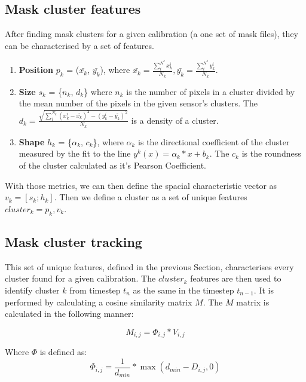 \subsection{Mask cluster features}

After finding mask clusters for a given calibration (a one set of mask files), they can be characterised by a set of features.

\begin{enumerate}
\item \textbf{Position}  {$p_k$ = ($\bar{x_k}$, $\bar{y_k}$}), where $\bar{x_k} = \frac{\sum_{i}^{N^k}x_k^i}{N_k},
    \bar{y_k} = \frac{\sum_{i}^{N^k}y_k^i}{N_k}$.
\item \textbf{Size} $s_k$ = \{$n_k$, $d_k$\} where $n_k$ is the number of pixels in a cluster divided by the mean number of the pixels in the given sensor's clusters. The $d_k = \frac{\sqrt{\sum_{i}^{N_k}(x_k^i - \bar{x_k})^2 - (y_k^i - \bar{y_k})^2}}{N_k}$ is a density of a cluster.

\item \textbf{Shape} $h_k$ = \{$\alpha_k$, $c_k$\}, where $\alpha_k$ is the directional coefficient of the cluster measured by the fit to the line $y^k(x) = \alpha_k*x + b_k$. The $c_k$ is the roundness of the cluster calculated as it's Pearson Coefficient.

\end{enumerate}



With those metrics, we can then define the spacial characteristic vector as $v_k = [s_k; h_k]$. Then we define a cluster as a set of unique features $cluster_k = {p_k, v_k}$.

\subsection{Mask cluster tracking}

This set of unique features, defined in the previous Section, characterises every cluster found for a given calibration.
The $cluster_{k}$ features are then used to identify cluster $k$ from timestep $t_{n}$ as the same in the timestep $t_{n-1}$.
It is performed by calculating a cosine similarity matrix $M$. The $M$ matrix is calculated in the following manner:

\begin{equation}
    M_{i,j} = \Phi_{i,j} * V_{i,j}
\end{equation}

Where $\Phi$ is defined as:
\begin{equation}
    \Phi_{i,j} = \frac{1}{d_{min}}*\max(d_{min} - D_{i,j}, 0)
\end{equation}

